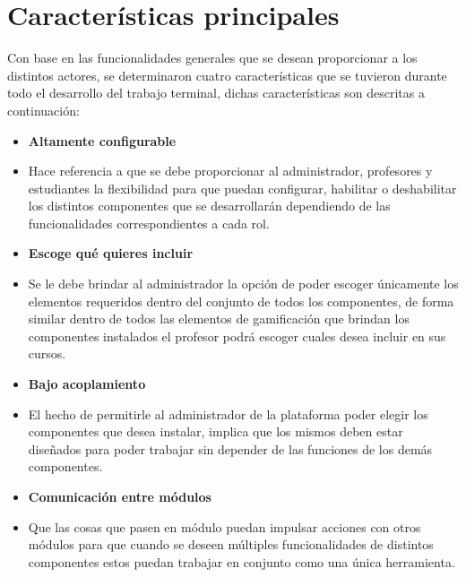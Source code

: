 \section{Características principales}

 Con base en las funcionalidades generales que se desean proporcionar a los distintos
 actores, se determinaron cuatro características que se tuvieron durante
 todo el desarrollo del trabajo terminal, dichas características son
 descritas a continuación:


    \begin{multicols}{2}
    \begin{itemize}
    \item{\bf\color{primary} Altamente configurable }

    \item[] Hace referencia a que se debe proporcionar al administrador, profesores
            y estudiantes la flexibilidad para que puedan configurar, habilitar o
            deshabilitar los distintos componentes que se desarrollarán dependiendo
            de las funcionalidades correspondientes a cada rol.

    \item{\bf\color{primary} Escoge qué quieres incluir }

    \item[] Se le debe brindar al administrador la opción de poder escoger únicamente
            los elementos requeridos dentro del conjunto de todos los componentes, de
            forma similar dentro de todos las elementos de gamificación que brindan
            los componentes instalados el profesor podrá escoger cuales desea incluir
            en sus cursos.

    \item{\bf\color{primary} Bajo acoplamiento }

    \item[] El hecho de permitirle al administrador de la plataforma poder elegir los
            componentes que desea instalar, implica que los mismos deben estar
            diseñados para poder trabajar sin depender de las funciones de los demás
            componentes.

    \item{\bf\color{primary} Comunicación entre módulos }

    \item[] Que las cosas que pasen en módulo puedan impulsar acciones con otros
            módulos para que cuando se deseen múltiples funcionalidades de distintos
            componentes estos puedan trabajar en conjunto como una única herramienta.
    \end{itemize}
    \end{multicols}
